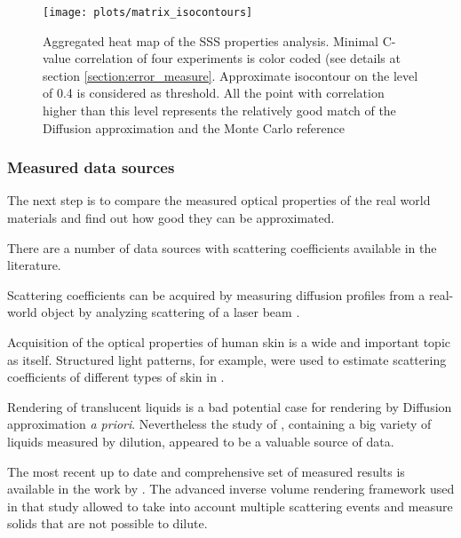\begin{figure}[h]
    \texttt{[image: plots/matrix\_isocontours]} \caption{Aggregated heat map of the
    SSS properties analysis. Minimal C-value correlation of four experiments is color coded (see
    details at section \ref{section:error_measure}. Approximate isocontour on the level of 0.4 is
    considered as threshold. All the point with correlation higher than this level represents the
    relatively good match of the Diffusion approximation and the Monte Carlo reference}
    \label{fig:material_props}
\end{figure}

\subsubsection{Measured data sources}
The next step is to compare the measured optical properties of the real world materials and find out
how good they can be approximated.

There are a number of data sources with scattering coefficients available in the literature.
 
Scattering coefficients can be acquired by measuring diffusion profiles from a real-world object by
analyzing scattering of a laser beam \cite{Jensen:2001:PMS:383259.383319}.

Acquisition of the optical properties of human skin is a wide and important topic as
itself. Structured light patterns, for example, were used to estimate scattering coefficients of
different types of skin in \cite{tariq_efficient_2006-1}.

Rendering of translucent liquids is a bad potential case for rendering by Diffusion approximation
\textit{a priori}. Nevertheless the study of \cite{Narasimhan:2006:ASP:1141911.1141986}, containing
a big variety of liquids measured by dilution, appeared to be a valuable source of data.

The most recent up to date and comprehensive set of measured results is available in the work by
\cite{Gkioulekas:2013:IVR:2508363.2508377}. The advanced inverse volume rendering framework used in
that study allowed to take into account multiple scattering events and measure solids that are not
possible to dilute.

